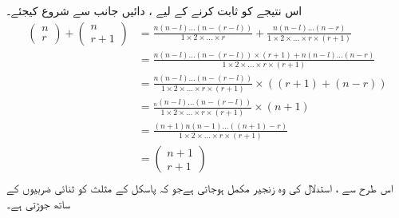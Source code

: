 اس نتیجے کو ثابت کرنے کے لیے ، دائیں جانب سے شروع کیجئے۔ 
\begin{align*}
  \begin{pmatrix}
     n\\r
     \end{pmatrix}
     +
    \begin{pmatrix}
     n\\r+1
     \end{pmatrix} &=\frac{ n(n-l) ... (n-(r-l)) }{1\times2\times...\times r}+\frac{n(n-l) ... (n-r) }{1\times2\times...\times r\times(r+1)}\\
    &= \frac{ n(n-l) ... (n-(r-l)) \times (r+ 1) + n(n-l) ... (n-r) }{1\times2\times...\times r\times(r+1)}\\
      &= \frac{n(n-l) ... (n-(r-l)) }{1\times2\times...\times r\times(r+1)}\times((r+1)+(n-r))\\
   &=\frac{_n(n-l) ... (n-(r-l)) }{1\times2\times...\times r\times(r+1)}\times(n+1)\\  
    &=\frac{ ( n + 1 )n( n -1) ... ((  n + 1) -r) }{1\times2\times...\times r\times(r+1)}\\
  &=  \begin{pmatrix}
     n+1\\r+1
     \end{pmatrix}\\
     \end{align*}
اس طرح سے ، استدلال کی وہ    زنجیر مکمل ہوجاتی ہےجو کہ پاسکل کے مثلث کو ثنائی ضربیوں کے ساتھ جوڑتی ہے۔ 

